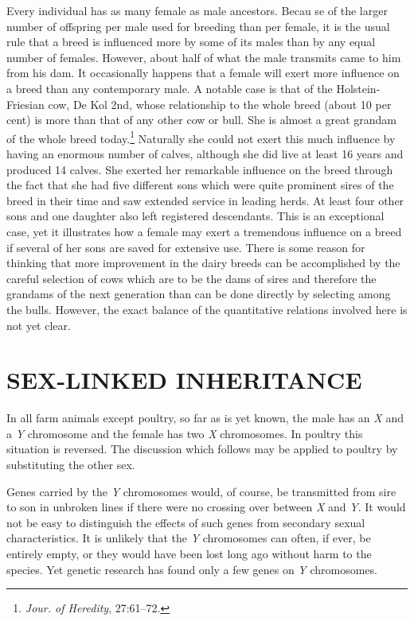 Every individual has as many female as male ancestors. Becau se of
the larger number of offspring per male used for breeding than per
female, it is the usual rule that a breed is influenced more by some of
its males than by any equal number of females. However, about half of
what the male transmits came to him from his dam. It occasionally
happens that a female will exert more influence on a breed than any
contemporary male. A notable case is that of the Holstein-Friesian cow,
De Kol 2nd, whose relationship to the whole breed (about 10 per cent)
is more than that of any other cow or bull. She is almost a great
grandam of the whole breed today.\footnote{\textit{Jour. of Heredity},
27:61--72.} Naturally she could not exert this
much influence by having an enormous number of calves, although she
did live at least 16 years and produced 14 calves. She exerted her
remarkable influence on the breed through the fact that she had five
different sons which were quite prominent sires of the breed in their
time and saw extended service in leading herds. At least four other sons
and one daughter also left registered descendants. This is an exceptional
case, yet it illustrates how a female may exert a tremendous influence
on a breed if several of her sons are saved for extensive use. There is
some reason for thinking that more improvement in the dairy breeds
can be accomplished by the careful selection of cows which are to be the
dams of sires and therefore the grandams of the next generation than
can be done directly by selecting among the bulls. However, the exact
balance of the quantitative relations involved here is not yet clear.

\section*{SEX-LINKED INHERITANCE}

In all farm animals except poultry, so far as is yet known, the male
has an \textit{X} and a \textit{Y} chromosome and the female has two
\textit{X} chromosomes. In poultry this situation is reversed. The
discussion which follows may be applied to poultry by substituting
the other sex.

Genes carried by the \textit{Y} chromosomes would, of course, be
transmitted from sire to son in unbroken lines if there were no
crossing over between \textit{X} and \textit{Y}. It would not be easy
to distinguish the effects of such genes from secondary sexual
characteristics. It is unlikely that the \textit{Y} chromosomes can
often, if ever, be entirely empty, or they would have been lost long
ago without harm to the species. Yet genetic research has found only
a few genes on \textit{Y} chromosomes.

